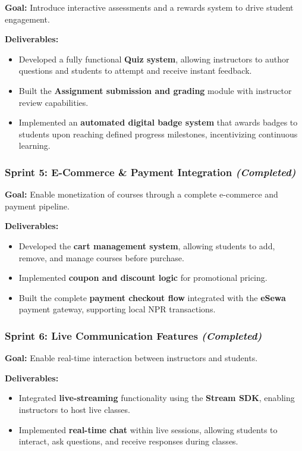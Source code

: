 \textbf{Goal:} Introduce interactive assessments and a rewards system to drive student engagement.

\textbf{Deliverables:}
\begin{itemize}
    \item Developed a fully functional \textbf{Quiz system}, allowing instructors to author questions and students to attempt and receive instant feedback.
    \item Built the \textbf{Assignment submission and grading} module with instructor review capabilities.
    \item Implemented an \textbf{automated digital badge system} that awards badges to students upon reaching defined progress milestones, incentivizing continuous learning.
\end{itemize}

\subsubsection*{Sprint 5: E-Commerce \& Payment Integration \hfill \textit{(Completed)}}

\textbf{Goal:} Enable monetization of courses through a complete e-commerce and payment pipeline.

\textbf{Deliverables:}
\begin{itemize}
    \item Developed the \textbf{cart management system}, allowing students to add, remove, and manage courses before purchase.
    \item Implemented \textbf{coupon and discount logic} for promotional pricing.
    \item Built the complete \textbf{payment checkout flow} integrated with the \textbf{eSewa} payment gateway, supporting local NPR transactions.
\end{itemize}

\subsubsection*{Sprint 6: Live Communication Features \hfill \textit{(Completed)}}

\textbf{Goal:} Enable real-time interaction between instructors and students.

\textbf{Deliverables:}
\begin{itemize}
    \item Integrated \textbf{live-streaming} functionality using the \textbf{Stream SDK}, enabling instructors to host live classes.
    \item Implemented \textbf{real-time chat} within live sessions, allowing students to interact, ask questions, and receive responses during classes.
\end{itemize}

